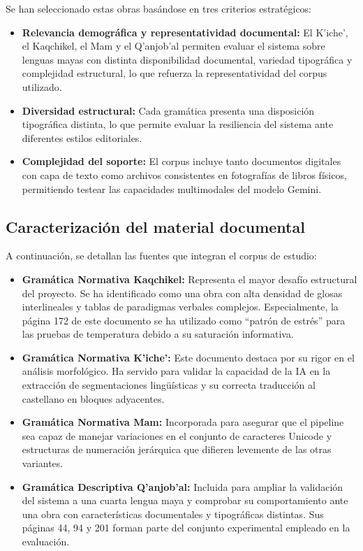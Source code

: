 Se han seleccionado estas obras basándose en tres criterios estratégicos:

\begin{itemize}
        \item \textbf{Relevancia demográfica y representatividad documental:} El K’iche’, el Kaqchikel, el Mam y el Q’anjob’al permiten evaluar el sistema sobre lenguas mayas con distinta disponibilidad documental, variedad tipográfica y complejidad estructural, lo que refuerza la representatividad del corpus utilizado.
    
    \item \textbf{Diversidad estructural:} Cada gramática presenta una disposición tipográfica distinta, lo que permite evaluar la resiliencia del sistema ante diferentes estilos editoriales.
    
    \item \textbf{Complejidad del soporte:} El corpus incluye tanto documentos digitales con capa de texto como archivos consistentes en fotografías de libros físicos, permitiendo testear las capacidades multimodales del modelo Gemini.
\end{itemize}

\subsection{Caracterización del material documental}

A continuación, se detallan las fuentes que integran el corpus de estudio:

\begin{itemize}
    \item \textbf{Gramática Normativa Kaqchikel:} Representa el mayor desafío estructural del proyecto. Se ha identificado como una obra con alta densidad de glosas interlineales y tablas de paradigmas verbales complejos. Especialmente, la página 172 de este documento se ha utilizado como ``patrón de estrés'' para las pruebas de temperatura debido a su saturación informativa.
    
    \item \textbf{Gramática Normativa K'iche':} Este documento destaca por su rigor en el análisis morfológico. Ha servido para validar la capacidad de la IA en la extracción de segmentaciones lingüísticas y su correcta traducción al castellano en bloques adyacentes.
    
    \item \textbf{Gramática Normativa Mam:} Incorporada para asegurar que el pipeline sea capaz de manejar variaciones en el conjunto de caracteres Unicode y estructuras de numeración jerárquica que difieren levemente de las otras variantes.

    \item \textbf{Gramática Descriptiva Q’anjob’al:} Incluida para ampliar la validación del sistema a una cuarta lengua maya y comprobar su comportamiento ante una obra con características documentales y tipográficas distintas. Sus páginas 44, 94 y 201 forman parte del conjunto experimental empleado en la evaluación.
\end{itemize}

